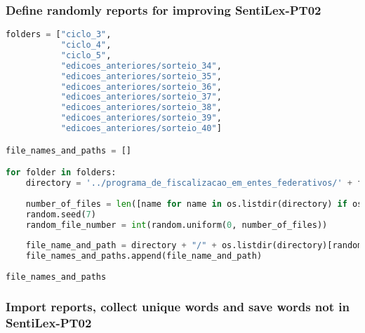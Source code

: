 \subsubsection{Define randomly reports for improving
SentiLex-PT02}\label{define-randomly-reports-for-improving-sentilex-pt02}

\begin{lstlisting}[language=Python]
folders = ["ciclo_3",
           "ciclo_4",
           "ciclo_5",
           "edicoes_anteriores/sorteio_34",
           "edicoes_anteriores/sorteio_35",
           "edicoes_anteriores/sorteio_36",
           "edicoes_anteriores/sorteio_37",
           "edicoes_anteriores/sorteio_38",
           "edicoes_anteriores/sorteio_39",
           "edicoes_anteriores/sorteio_40"]

file_names_and_paths = []

for folder in folders:
    directory = '../programa_de_fiscalizacao_em_entes_federativos/' + folder
    
    number_of_files = len([name for name in os.listdir(directory) if os.path.isfile(os.path.join(directory, name))]) - 3
    random.seed(7)
    random_file_number = int(random.uniform(0, number_of_files))
    
    file_name_and_path = directory + "/" + os.listdir(directory)[random_file_number]
    file_names_and_paths.append(file_name_and_path)
    
file_names_and_paths
\end{lstlisting}

\subsubsection{Import reports, collect unique words and save words not
in
SentiLex-PT02}\label{import-reports-collect-unique-words-and-save-words-not-in-sentilex-pt02}

